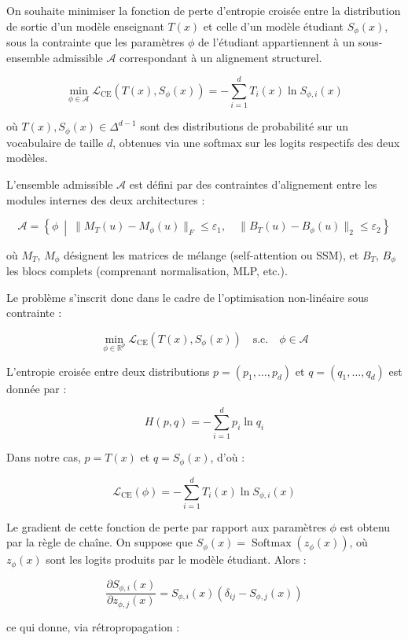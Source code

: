 \begin{demonstration}
On souhaite minimiser la fonction de perte d'entropie croisée entre la distribution de sortie d’un modèle enseignant $T(x)$ et celle d’un modèle étudiant $S_\phi(x)$, sous la contrainte que les paramètres $\phi$ de l’étudiant appartiennent à un sous-ensemble admissible $\mathcal{A}$ correspondant à un alignement structurel.

\[
\min_{\phi \in \mathcal{A}} \mathcal{L}_{\text{CE}}(T(x), S_\phi(x)) = -\sum_{i=1}^d T_i(x) \ln S_{\phi,i}(x)
\]

où $T(x), S_\phi(x) \in \Delta^{d-1}$ sont des distributions de probabilité sur un vocabulaire de taille $d$, obtenues via une softmax sur les logits respectifs des deux modèles.

L’ensemble admissible $\mathcal{A}$ est défini par des contraintes d’alignement entre les modules internes des deux architectures :

\[
\mathcal{A} = \left\{ \phi \ \middle| \ \|M_T(u) - M_\phi(u)\|_F \leq \varepsilon_1,\quad \|B_T(u) - B_\phi(u)\|_2 \leq \varepsilon_2 \right\}
\]

où $M_T$, $M_\phi$ désignent les matrices de mélange (self-attention ou SSM), et $B_T$, $B_\phi$ les blocs complets (comprenant normalisation, MLP, etc.).

Le problème s’inscrit donc dans le cadre de l’optimisation non-linéaire sous contrainte :

\[
\min_{\phi \in \mathbb{R}^p} \mathcal{L}_{\text{CE}}(T(x), S_\phi(x)) \quad \text{s.c.} \quad \phi \in \mathcal{A}
\]

L’entropie croisée entre deux distributions $p = (p_1, \ldots, p_d)$ et $q = (q_1, \ldots, q_d)$ est donnée par :

\[
H(p, q) = -\sum_{i=1}^d p_i \ln q_i
\]

Dans notre cas, $p = T(x)$ et $q = S_\phi(x)$, d’où :

\[
\mathcal{L}_{\text{CE}}(\phi) = -\sum_{i=1}^d T_i(x) \ln S_{\phi,i}(x)
\]

Le gradient de cette fonction de perte par rapport aux paramètres $\phi$ est obtenu par la règle de chaîne. On suppose que $S_\phi(x) = \operatorname{Softmax}(z_\phi(x))$, où $z_\phi(x)$ sont les logits produits par le modèle étudiant. Alors :

\[
\frac{\partial S_{\phi,i}(x)}{\partial z_{\phi,j}(x)} = S_{\phi,i}(x)(\delta_{ij} - S_{\phi,j}(x))
\]

ce qui donne, via rétropropagation :


\end{demonstration}
